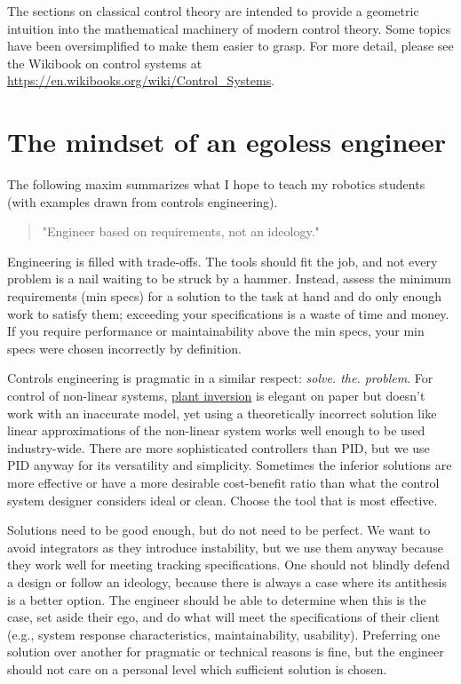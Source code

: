 The sections on classical control theory are intended to provide a geometric
intuition into the mathematical machinery of modern control theory. Some topics
have been oversimplified to make them easier to grasp. For more detail, please
see the Wikibook on control systems at
\url{https://en.wikibooks.org/wiki/Control_Systems}.

\section{The mindset of an egoless engineer}

The following maxim summarizes what I hope to teach my robotics students (with
examples drawn from controls engineering).

\begin{quote}
  "Engineer based on requirements, not an ideology."
\end{quote}

Engineering is filled with trade-offs. The tools should fit the job, and not
every problem is a nail waiting to be struck by a hammer. Instead, assess the
minimum requirements (min specs) for a solution to the task at hand and do only
enough work to satisfy them; exceeding your specifications is a waste of time
and money. If you require performance or maintainability above the min specs,
your min specs were chosen incorrectly by definition.

Controls engineering is pragmatic in a similar respect:
\textit{solve. the. problem}. For control of non-linear systems,
\href{https://faculty.washington.edu/devasia/Inversion.html}{plant inversion}
is elegant on paper but doesn't work with an inaccurate model, yet using a
theoretically incorrect solution like linear approximations of the non-linear
system works well enough to be used industry-wide. There are more sophisticated
controllers than PID, but we use PID anyway for its versatility and simplicity.
Sometimes the inferior solutions are more effective or have a more desirable
cost-benefit ratio than what the control system designer considers ideal or
clean. Choose the tool that is most effective.

Solutions need to be good enough, but do not need to be perfect. We want to
avoid integrators as they introduce instability, but we use them anyway because
they work well for meeting tracking specifications. One should not blindly
defend a design or follow an ideology, because there is always a case where its
antithesis is a better option. The engineer should be able to determine when
this is the case, set aside their ego, and do what will meet the specifications
of their client (e.g., system response characteristics, maintainability,
usability). Preferring one solution over another for pragmatic or technical
reasons is fine, but the engineer should not care on a personal level which
sufficient solution is chosen.


